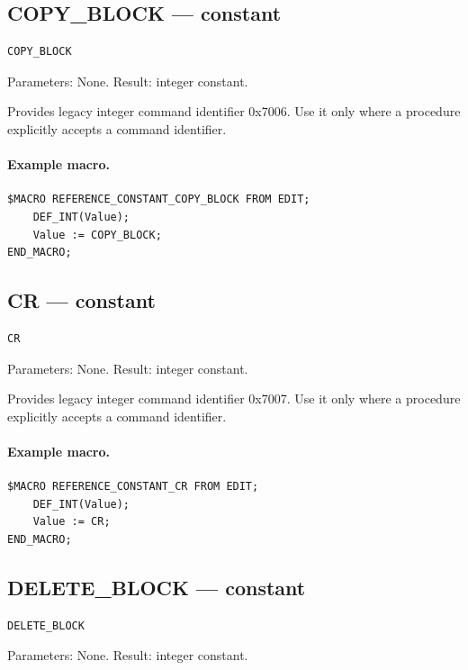 \documentclass[a4paper,10pt,twoside,openany]{book}
\begin{document}
\label{prim:constant-copy-block}
\subsection*{COPY\_BLOCK --- constant}
\begin{verbatim}
COPY_BLOCK
\end{verbatim}
Parameters: None. Result: integer constant.

Provides legacy integer command identifier 0x7006. Use it only where a procedure explicitly accepts a command identifier.

\paragraph{Example macro.}
\begin{verbatim}
$MACRO REFERENCE_CONSTANT_COPY_BLOCK FROM EDIT;
    DEF_INT(Value);
    Value := COPY_BLOCK;
END_MACRO;
\end{verbatim}

\label{prim:constant-cr}
\subsection*{CR --- constant}
\begin{verbatim}
CR
\end{verbatim}
Parameters: None. Result: integer constant.

Provides legacy integer command identifier 0x7007. Use it only where a procedure explicitly accepts a command identifier.

\paragraph{Example macro.}
\begin{verbatim}
$MACRO REFERENCE_CONSTANT_CR FROM EDIT;
    DEF_INT(Value);
    Value := CR;
END_MACRO;
\end{verbatim}

\label{prim:constant-delete-block}
\subsection*{DELETE\_BLOCK --- constant}
\begin{verbatim}
DELETE_BLOCK
\end{verbatim}
Parameters: None. Result: integer constant.
\end{document}
